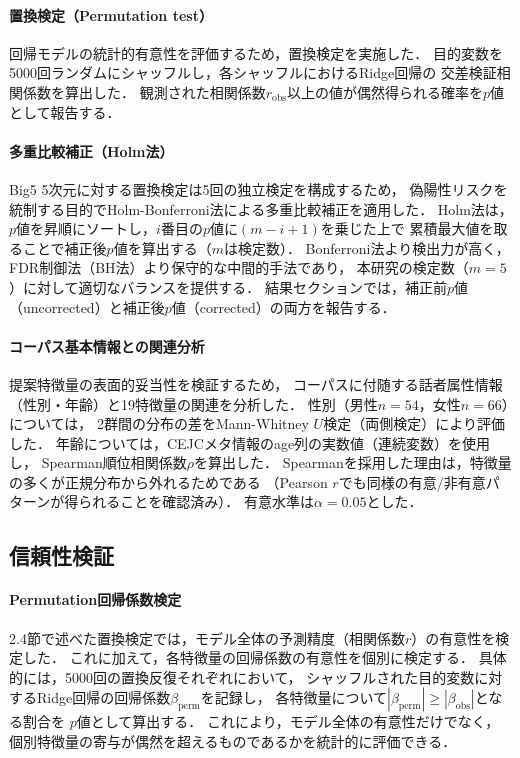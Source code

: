 \documentclass[dvipdfmx,11pt,a4paper]{bxjsarticle}
\begin{document}
\paragraph{置換検定（Permutation test）}
回帰モデルの統計的有意性を評価するため，置換検定を実施した．
目的変数を5000回ランダムにシャッフルし，各シャッフルにおけるRidge回帰の
交差検証相関係数を算出した．
観測された相関係数$r_{\text{obs}}$以上の値が偶然得られる確率を$p$値として報告する．

\paragraph{多重比較補正（Holm法）}
Big5 5次元に対する置換検定は5回の独立検定を構成するため，
偽陽性リスクを統制する目的でHolm-Bonferroni法\cite{holm1979}による多重比較補正を適用した．
Holm法は，$p$値を昇順にソートし，$i$番目の$p$値に$(m - i + 1)$を乗じた上で
累積最大値を取ることで補正後$p$値を算出する（$m$は検定数）．
Bonferroni法より検出力が高く，FDR制御法（BH法）より保守的な中間的手法であり，
本研究の検定数（$m = 5$）に対して適切なバランスを提供する．
結果セクションでは，補正前$p$値（uncorrected）と補正後$p$値（corrected）の両方を報告する．

\paragraph{コーパス基本情報との関連分析}
提案特徴量の表面的妥当性を検証するため，
コーパスに付随する話者属性情報（性別・年齢）と19特徴量の関連を分析した．
性別（男性$n = 54$，女性$n = 66$）については，
2群間の分布の差をMann-Whitney $U$検定（両側検定）により評価した．
年齢については，CEJCメタ情報のage列の実数値（連続変数）を使用し，
Spearman順位相関係数$\rho$を算出した．
Spearmanを採用した理由は，特徴量の多くが正規分布から外れるためである
（Pearson $r$でも同様の有意/非有意パターンが得られることを確認済み）．
有意水準は$\alpha = 0.05$とした．

\subsection{信頼性検証}
\label{sec:reliability}

\paragraph{Permutation回帰係数検定}
2.4節で述べた置換検定では，モデル全体の予測精度（相関係数$r$）の有意性を検定した．
これに加えて，各特徴量の回帰係数の有意性を個別に検定する．
具体的には，5000回の置換反復それぞれにおいて，
シャッフルされた目的変数に対するRidge回帰の回帰係数$\beta_{\text{perm}}$を記録し，
各特徴量について$|\beta_{\text{perm}}| \geq |\beta_{\text{obs}}|$となる割合を
$p$値として算出する．
これにより，モデル全体の有意性だけでなく，
個別特徴量の寄与が偶然を超えるものであるかを統計的に評価できる．
\end{document}
